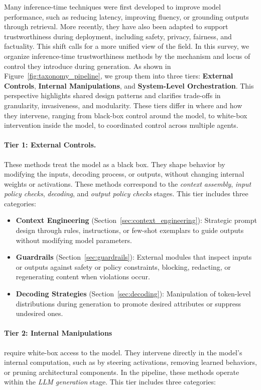 Many inference-time techniques were first developed to improve model performance, such as reducing latency, improving fluency, or grounding outputs through retrieval. More recently, they have also been adapted to support trustworthiness during deployment, including safety, privacy, fairness, and factuality. This shift calls for a more unified view of the field. In this survey, we organize inference-time trustworthiness methods by the mechanism and locus of control they introduce during generation. As shown in Figure~\ref{fig:taxonomy_pipeline}, we group them into three tiers: \textbf{External Controls}, \textbf{Internal Manipulations}, and \textbf{System-Level Orchestration}. This perspective highlights shared design patterns and clarifies trade-offs in granularity, invasiveness, and modularity. These tiers differ in where and how they intervene, ranging from black-box control around the model, to white-box intervention inside the model, to coordinated control across multiple agents.

\paragraph{Tier 1: External Controls.} These methods treat the model as a black box. They shape behavior by modifying the inputs, decoding process, or outputs, without changing internal weights or activations. These methods correspond to the \emph{context assembly}, \emph{input policy checks}, \emph{decoding}, and \emph{output policy checks} stages. This tier includes three categories:

\begin{itemize}
\item \textbf{Context Engineering} (Section~\ref{sec:context_engineering}): Strategic prompt design through rules, instructions, or few-shot exemplars to guide outputs without modifying model parameters.
\item \textbf{Guardrails} (Section~\ref{sec:guardrails}): External modules that inspect inputs or outputs against safety or policy constraints, blocking, redacting, or regenerating content when violations occur.
\item \textbf{Decoding Strategies} (Section~\ref{sec:decoding}): Manipulation of token-level distributions during generation to promote desired attributes or suppress undesired ones.
\end{itemize}

\paragraph{Tier 2: Internal Manipulations} require white-box access to the model. They intervene directly in the model's internal computation, such as by steering activations, removing learned behaviors, or pruning architectural components. In the pipeline, these methods operate within the \emph{LLM generation} stage. This tier includes three categories:

